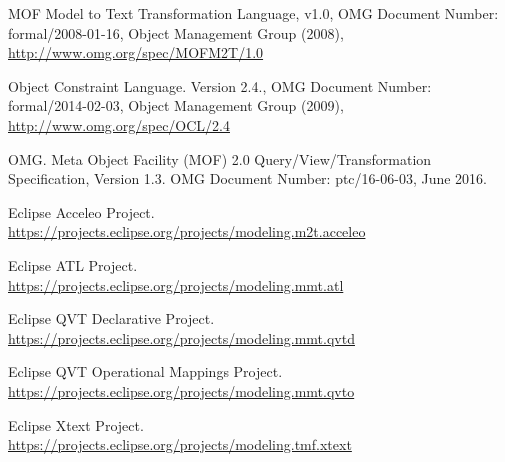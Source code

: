 \documentclass{llncs}
\begin{document}
\begin{thebibliography}{}
MOF Model to Text Transformation Language, v1.0, OMG Document Number: formal/2008-01-16, Object Management Group (2008),  \url{http://www.omg.org/spec/MOFM2T/1.0}

Object Constraint Language. Version 2.4., OMG Document Number: formal/2014-02-03, Object Management Group (2009),  \url{http://www.omg.org/spec/OCL/2.4}

OMG. Meta Object Facility (MOF) 2.0 Query/View/Transformation Specification, Version 1.3.
OMG Document Number: ptc/16-06-03, June 2016.

Eclipse Acceleo Project.\\
\url{https://projects.eclipse.org/projects/modeling.m2t.acceleo}

Eclipse ATL Project.\\
\url{https://projects.eclipse.org/projects/modeling.mmt.atl}

Eclipse QVT Declarative Project.\\
\url{https://projects.eclipse.org/projects/modeling.mmt.qvtd}

Eclipse QVT Operational Mappings Project.\\
\url{https://projects.eclipse.org/projects/modeling.mmt.qvto}

Eclipse Xtext Project.\\
\url{https://projects.eclipse.org/projects/modeling.tmf.xtext}

\end{thebibliography}
\end{document}
